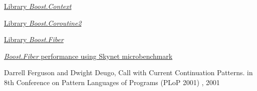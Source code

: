 \begin{thebibliography}{99}
        \href{http://www.boost.org/doc/libs/release/libs/context/doc/html/index.html}
        {Library \emph{Boost.Context}}

        \href{http://www.boost.org/doc/libs/release/libs/coroutine2/doc/html/index.html}
        {Library \emph{Boost.Coroutine2}}

        \href{http://www.boost.org/doc/libs/release/libs/fiber/doc/html/index.html}
        {Library \emph{Boost.Fiber}}

        \href{http://www.boost.org/doc/libs/release/libs/fiber/doc/html/fiber/performance.html}
        {\emph{Boost.Fiber} performance using Skynet microbenchmark}

        {Darrell Ferguson and Dwight Deugo, Call with Current Continuation Patterns.
        in 8th Conference on Pattern Languages of Programs (PLoP 2001) , 2001}

\end{thebibliography}

